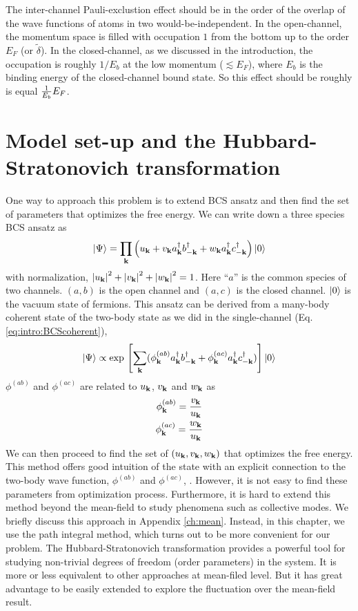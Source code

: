 The inter-channel Pauli-exclustion effect should be in the order of the overlap of the wave functions of atoms in two would-be-independent. In the open-channel, the momentum space is filled  with occupation $1$ from the bottom up to the order $E_F$ (or $\tilde\delta$). In the closed-channel, as we discussed in the introduction, the occupation is roughly $1/E_b$ at the low momentum ($\lesssim{}E_F$), where $E_b$ is the binding energy of the closed-channel bound state.   So this effect should be roughly is equal $\frac{1}{E_b}E_F$.

\section{Model set-up and the Hubbard-Stratonovich transformation}

One way to approach this problem is to extend BCS ansatz and then find the set of parameters that optimizes the free energy.  We can write down a  three species BCS ansatz as 
\begin{equation}\label{eq:pathInt2:ansatz}
\left|\Psi\right>=\prod_{\mathbf{k}}\left(u_{\mathbf{k}}+v_{\mathbf{k}}{}a^{\dagger}_{\mathbf{k}}{}b^{\dagger}_{-\mathbf{k}}+w_{\mathbf{k}}{}a^{\dagger}_{\mathbf{k}}{}c^{\dagger}_{-\mathbf{k}}\right)\left|0\right>
\end{equation} 
with normalization, $\left\lvert{u_{\ensuremath{\mathbf{k}}}}\right\rvert^2+\left\lvert{v_{\ensuremath{\mathbf{k}}}}\right\rvert^2+\left\lvert{w_{\ensuremath{\mathbf{k}}}}\right\rvert^2=1$.   Here ``$a$'' is the common species of two channels. $(a,b)$ is the open channel and $(a,c)$ is the closed channel.  $\left|0\right>$ is the vacuum state of fermions. This ansatz can be derived from a many-body coherent state of the two-body state as we did in the single-channel (Eq. \ref{eq:intro:BCScoherent}), 
\begin{equation}\label{eq:pathInt2:ansatzCoh}
\left|\Psi\right>\propto\exp{}\left[\sum_{\mathbf{k}}(\phi^{(ab)}_{\mathbf{k}}{}a^{\dagger}_{\mathbf{k}}{}b^{\dagger}_{-\mathbf{k}}+\phi^{(ac)}_{\mathbf{k}}{}a^{\dagger}_{\mathbf{k}}{}c^{\dagger}_{-\mathbf{k}})\right]\left|0\right>
\end{equation} 
$\phi^{(ab)}$ and $\phi^{(ac)}$ are related to $u_{\mathbf{k}}$, $v_{\mathbf{k}}$ and $w_{\mathbf{k}}$ as  
\begin{gather}
\phi_{\mathbf{k}}^{(ab)}=\frac{v_{\mathbf{k}}}{u_{\mathbf{k}}}\\
\phi_{\mathbf{k}}^{(ac)}=\frac{w_{\mathbf{k}}}{u_{\mathbf{k}}}\label{eq:pathInt2:phiWU}
\end{gather}
 We can then proceed to find the set of $(u_{\mathbf{k}},v_{\mathbf{k}},w_{\mathbf{k}})$ that optimizes the free energy. This method offers good intuition of the state  with an explicit connection to the two-body wave function, $\phi^{(ab)}$ and $\phi^{(ac)}$, .  However,  it is not easy to find these parameters from optimization process. Furthermore, it is hard to extend this method beyond the mean-field to study phenomena such as collective modes.  We briefly discuss this approach in Appendix \ref{ch:mean}. Instead, in this chapter, we use the path integral method, which turns out to be  more convenient for our problem.   The Hubbard-Stratonovich transformation provides a powerful tool for studying non-trivial degrees of freedom (order parameters) in the system.  It is more or less equivalent to other approaches at mean-filed level. But it has great advantage to be easily extended to explore the fluctuation over the mean-field result.  

